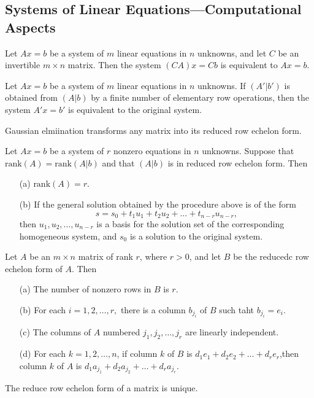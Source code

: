 \subsection{Systems of Linear Equations---Computational Aspects}
\begin{theorem}
    Let \( Ax = b \) be a system of \( m \) linear equations in \( n \) unknowns, and let \( C \) be an invertible \( m \times n \) matrix. Then the system \((CA)\)\(x = Cb \) is equivalent to \( Ax = b \).
\end{theorem}
\vspace{4cm}
\begin{corollary}
    Let \( Ax = b \) be a system of \( m \) linear equations in \( n \) unknowns.
    If \((A'|b')\) is obtained from \((A |b)\) by a finite number of elementary row operations, then the system \( A'x = b' \) is equivalent to the original system.
\end{corollary}
\vspace{4cm}
\begin{theorem}
    Gaussian elmiination transforms any matrix into its reduced row echelon form.
\end{theorem}
\begin{theorem}
    Let \(Ax = b \) be a system of \( r \) nonzero equations in \( n \) unknowns. Suppose that \(\text{rank}(A) = \text{rank}(A|b)\) and that \((A|b)\) is in reduced row echelon form. Then
    \begin{enumerate}
        \item[(a)] \(\text{rank}(A) = r \).
        \item[(b)] If the general solution obtained by the procedure above is of the form
        \[
        s = s_0 + t_1 u_1 + t_2 u_2 + \dots + t_{n-r} u_{n-r},
        \]
        then {\(u_1,u_2,\dots , u_{n-r}\)} is a basis for the solution set of the corresponding homogeneous system, and \( s_0 \) is a solution to the original system.
    \end{enumerate}
\end{theorem}
\vspace{5cm}
\begin{theorem}
    Let \(A\) be an \(m\times n\) matrix of rank \(r\), where \(r > 0\), and let \( B \) be the reducedc row echelon form of \( A \). Then
\begin{enumerate}
    \item[(a)] The number of nonzero rows in \( B \) is \(r\).
    \item[(b)] For each \( i = 1, 2, \dots , r ,\) there is a column \(b_{j_i}\) of \(B\) such taht \(b_{j_i} = e_i \).
    \item[(c)] The columns of \( A \) numbered \( j_1, j_2, \dots , j_r \) are linearly independent.
    \item[(d)] For each \( k = 1, 2, \dots, n \), if column \(k\) of \(B \) is \(d_1 e_1 + d_2 e_2 + \dots + d_r e_r \),then column \( k \) of \(A \) is \(d_1 a_{j_1}+d_2 a_{j_2} + \dots + d_r a_{j_r} \).
\end{enumerate}
\end{theorem}
\begin{theorem}
    The reduce row echelon form of a matrix is unique.
\end{theorem}
\vspace{3cm}